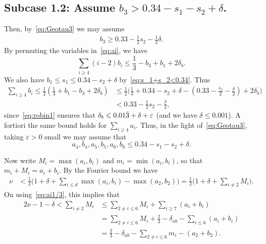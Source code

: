 \subsection*{Subcase 1.2: Assume $b_3> 0.34-s_1-s_2+\delta$.}
Then, by~\eqref{eq:Geotau3} we may assume
\begin{align}\label{eq:b3}
b_3\geq 0.33 -\frac{1}{2}s_2-\frac{1}{2}\delta.
\end{align}
By permuting the variables in~\eqref{eq:ai}, we have
\[
\sum_{i\ge4} (i-2)b_i\le\frac{1}{3}-b_3+b_1 + 2\delta_b.
\]
We also have
$b_1\leq s_1\leq 0.34 -s_2+\delta$
by~\eqref{eq:s_1+s_2<0.34}.
Thus
\begin{align*}
\sum_{i\geq 4}b_i \le \frac{1}{2}\left(\frac{1}{3}+b_1-b_3+2\delta_b\right)
&\le \frac{1}{2}\Big(\frac{1}{3}+0.34
-s_2+\delta
-
(0.33
-\frac{s_2}{2}
-\frac{\delta}{2})
+2\delta_b\Big)\\ &< 0.33-\frac{1}{2}s_2-\frac{\delta}{2},
\end{align*}
since~\eqref{eq:robin1} ensures that $\delta_b\leqslant 0.01\bar 3+\delta+\varepsilon$ (and we have $\delta\leq 0.001$). A fortiori the same bound holds for $\sum_{i\geq 4}a_i$. Thus, in the light of~\eqref{eq:Geotau3}, taking $\varepsilon>0$ small we may assume that
\[
a_4,b_4,a_5,b_5,a_6,b_6\leq 0.34-s_1-s_2+\delta.
\]

Now write $M_i = \max(a_i,b_i)$ and $m_i = \min(a_i,b_i)$, so that $m_i+M_i=a_i+b_i$. By the Fourier bound we have
\begin{align*}
\nu & < \frac{1}{2}\Big(1+\delta+ \sum_{i\leq d} \max(a_i,b_i) - \max(a_2,b_2)\Big) = \frac{1}{2}\Big(1 +\delta+ \sum_{i\neq 2}M_i\Big).
\end{align*}
On using~\eqref{eq:ai1/3},
this implies that
\begin{align*}
2\nu -1-\delta < \sum_{i\neq 2} M_i &\le \sum_{2\neq i \le 6}M_i + \sum_{i\ge7} (a_i+b_i)\\
&= \sum_{2\neq i \le 6}M_i + \frac{2}{3} -\delta_{ab} - \sum_{i\le 6}(a_i+b_i)\\
&= \frac{2}{3} -\delta_{ab}-\sum_{2\neq i \le 6}m_i - (a_2+b_2).
\end{align*}

